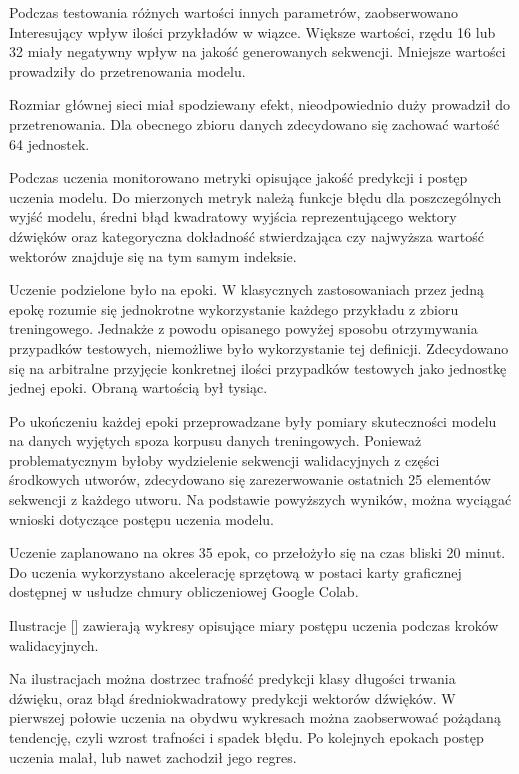 {{        Podczas testowania różnych wartości innych parametrów, zaobserwowano Interesujący wpływ ilości przykładów w wiązce.
        Większe wartości, rzędu 16 lub 32 miały negatywny wpływ na jakość generowanych sekwencji. 
        Mniejsze wartości prowadziły do przetrenowania modelu.

        Rozmiar głównej sieci miał spodziewany efekt, nieodpowiednio duży prowadził do przetrenowania. Dla obecnego
        zbioru danych zdecydowano się zachować wartość 64 jednostek.

        Podczas uczenia monitorowano metryki opisujące jakość predykcji i postęp uczenia modelu.
        Do mierzonych metryk należą funkcje błędu dla poszczególnych wyjść modelu, średni błąd kwadratowy
        wyjścia reprezentującego wektory dźwięków oraz kategoryczna dokładność stwierdzająca czy najwyższa wartość
        wektorów znajduje się na tym samym indeksie.
        
        Uczenie podzielone było na epoki. W klasycznych zastosowaniach przez jedną epokę rozumie się jednokrotne
        wykorzystanie każdego przykładu z zbioru treningowego. Jednakże z powodu opisanego powyżej sposobu otrzymywania
        przypadków testowych, niemożliwe było wykorzystanie tej definicji. Zdecydowano się na arbitralne przyjęcie konkretnej 
        ilości przypadków testowych jako jednostkę jednej epoki. Obraną wartością był tysiąc.

        Po ukończeniu każdej epoki przeprowadzane były pomiary skuteczności modelu na danych wyjętych spoza korpusu 
        danych treningowych. Ponieważ problematycznym byłoby wydzielenie sekwencji walidacyjnych z części środkowych
        utworów, zdecydowano się zarezerwowanie ostatnich 25 elementów sekwencji z każdego utworu.
        Na podstawie powyższych wyników, można wyciągać wnioski dotyczące postępu uczenia modelu.

        Uczenie zaplanowano na okres 35 epok, co przełożyło się na czas bliski 20 minut. Do uczenia wykorzystano
        akcelerację sprzętową w postaci karty graficznej dostępnej w usłudze chmury obliczeniowej Google Colab.

        Ilustracje [] zawierają wykresy opisujące miary postępu uczenia podczas kroków walidacyjnych.


        Na ilustracjach można dostrzec trafność predykcji klasy długości trwania dźwięku, oraz błąd średniokwadratowy
        predykcji wektorów dźwięków. W pierwszej połowie uczenia na obydwu wykresach można zaobserwować pożądaną tendencję,
        czyli wzrost trafności i spadek błędu. Po kolejnych epokach postęp uczenia malał, lub nawet zachodził jego regres.
    }
}